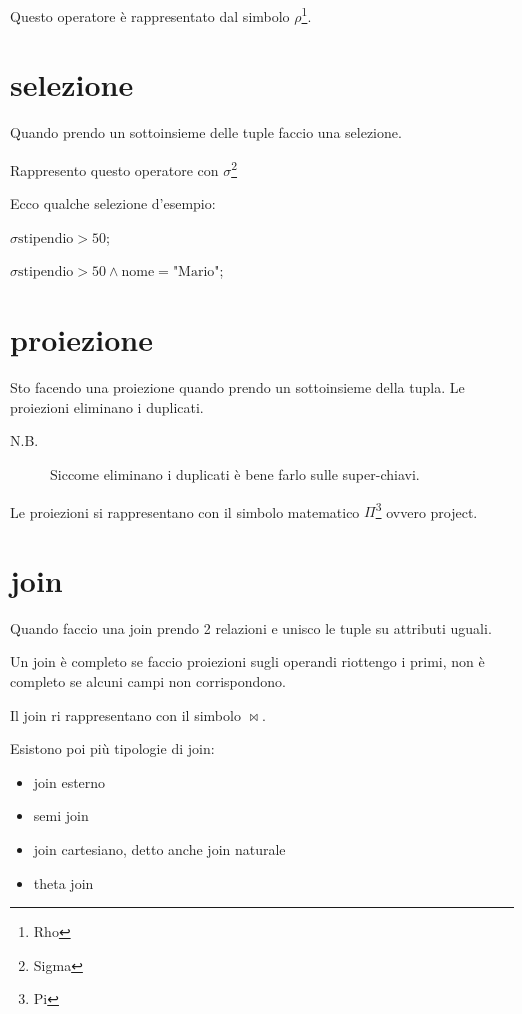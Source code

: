 Questo operatore è rappresentato dal simbolo $\rho $\footnote{Rho}.

\section{selezione}

Quando prendo un sottoinsieme delle tuple faccio una selezione.

Rappresento questo operatore con $\sigma $\footnote{Sigma}

\begin{exmp}

Ecco qualche selezione d'esempio:

$\sigma \text{stipendio} > 50$;

$\sigma \text{stipendio} > 50 \wedge \text{nome}=\text{"Mario"}$;
\end{exmp}

\section{proiezione}

Sto facendo una proiezione quando prendo un sottoinsieme della tupla. Le proiezioni eliminano i duplicati.


\begin{description}
	\item[N.B.] Siccome eliminano i duplicati è bene farlo sulle super-chiavi.
\end{description}

Le proiezioni si rappresentano con il simbolo matematico $\Pi$\footnote{Pi} ovvero project.

\section{join}

Quando faccio una join prendo 2 relazioni e unisco le tuple su attributi uguali.

Un join è completo se faccio proiezioni sugli operandi riottengo i primi, non è completo se alcuni campi non corrispondono.

Il join ri rappresentano con il simbolo $\bowtie$.

Esistono poi più tipologie di join:
\begin{itemize}
    \item join esterno
    \item semi join
    \item join cartesiano, detto anche join naturale
    \item theta join
\end{itemize}



